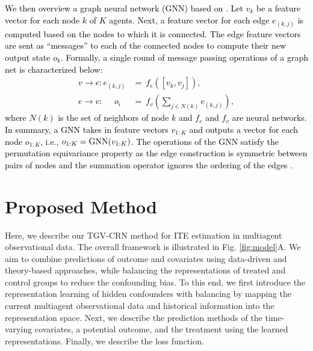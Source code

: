 \documentclass[journal]{IEEEtran}
\newcommand{\model}{{TGV-CRN}\xspace}
\newcommand{\eq}[1]{\begin{align}#1\end{align}}
\begin{document}
\textcolor{black}{
We then overview a graph neural network (GNN) based on \cite{Kipf18}.
Let $v_k$ be a feature vector for each node $k$ of $K$ agents. 
Next, a feature vector for each edge $e_{(k,j)}$ is computed based on the nodes to which it is connected. 
The edge feature vectors are sent as ``messages'' to each of the connected nodes to compute their new output state $o_k$.
Formally, a single round of message passing operations of a graph net is characterized below:
}
\textcolor{black}{
\eq{
v\rightarrow e: e_{(k,j)} &= ~f_e([v_k,v_j]), \\
e\rightarrow v: ~~~~~~o_i &= ~f_v\left(\sum_{j\in N(k)} e_{(k,j)}\right),
\label{eq:message} 
}}
\textcolor{black}{where $N(k)$ is the set of neighbors of node $k$ and $f_e$ and $f_v$ are neural networks.
In summary, a GNN takes in feature vectors $v_{1:K}$ and outputs a vector for each node $o_{1:K}$, i.e., $o_{1:K} = {\rm{GNN}}(v_{1:K})$. 
The operations of the GNN satisfy the permutation equivariance property as the edge construction is symmetric between pairs of nodes and the summation operator ignores the ordering of the edges \cite{zaheer2017deep}.
}

\vspace{10pt}
\section{Proposed Method}
\label{sec:proposed}
Here, we describe our \model method for ITE estimation in multiagent observational data. 
The overall framework is illustrated in Fig. \ref{fig:model}A.
We aim to combine predictions of outcome and covariates using data-driven and theory-based approaches, while balancing the representations of treated and control groups to reduce the confounding bias.
To this end, we first introduce the representation learning of hidden confounders with balancing by mapping the current multiagent
observational data and historical information into the representation space.
Next, we describe the prediction methods of the time-varying covariates, a potential outcome, and the treatment using the learned representations.
Finally, we describe the loss function.
\end{document}
